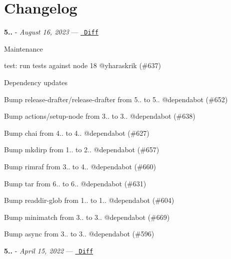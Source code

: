 \chapter{Changelog}
\hypertarget{md__2_users_2hello_2_documents_2_git_hub_2finalproject-engine-drop-table-engines_2_engine_2src_2bbd5134af61acce69c8a1a7fe044f7df}{}\label{md__2_users_2hello_2_documents_2_git_hub_2finalproject-engine-drop-table-engines_2_engine_2src_2bbd5134af61acce69c8a1a7fe044f7df}
\label{md__2_users_2hello_2_documents_2_git_hub_2finalproject-engine-drop-table-engines_2_engine_2src_2bbd5134af61acce69c8a1a7fe044f7df_autotoc_md2389}%
%


{\bfseries{5..}} -\/ 
\footnotesize {\itshape August 16, 2023}
\normalsize  — \href{https://github.com/archiverjs/node-archiver/compare/5.3.1...5.3.2}{\texttt{ Diff}}

Maintenance


\begin{DoxyItemize}
\item test\+: run tests against node 18 @yharaskrik (\#637)
\end{DoxyItemize}

Dependency updates


\begin{DoxyItemize}
\item Bump release-\/drafter/release-\/drafter from 5.. to 5.. @dependabot (\#652)
\item Bump actions/setup-\/node from 3.. to 3.. @dependabot (\#638)
\item Bump chai from 4.. to 4.. @dependabot (\#627)
\item Bump mkdirp from 1.. to 2.. @dependabot (\#657)
\item Bump rimraf from 3.. to 4.. @dependabot (\#660)
\item Bump tar from 6.. to 6.. @dependabot (\#631)
\item Bump readdir-\/glob from 1.. to 1.. @dependabot (\#604)
\item Bump minimatch from 3.. to 3.. @dependabot (\#669)
\item Bump async from 3.. to 3.. @dependabot (\#596)
\end{DoxyItemize}

{\bfseries{5..}} -\/ 
\footnotesize {\itshape April 15, 2022}
\normalsize  — \href{https://github.com/archiverjs/node-archiver/compare/5.3.0...5.3.1}{\texttt{ Diff}}

